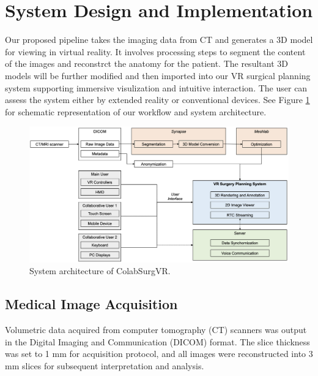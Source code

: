 \documentclass{bmcart}
\begin{document}
 
 
\section{System Design and Implementation}
Our proposed pipeline takes the imaging data from CT and generates a 3D model for viewing in virtual reality. It involves processing steps to segment the content of the images and reconstrct the anatomy for the patient. The resultant 3D models will be further modified and then imported into our VR surgical planning system supporting immersive visulization and intuitive interaction. The user can assess the system either by extended reality or conventional devices. See Figure \ref{fig:Scheme} for schematic representation of our workflow and system architecture.



\begin{figure}
  \centering
  \includegraphics[width=.9\linewidth]{../Media/Scheme}  
  \caption{System architecture of ColabSurgVR.}
  \label{fig:Scheme}
\end{figure}

\subsection{Medical Image Acquisition}
Volumetric data acquired from computer tomography (CT) scanners was output in the Digital Imaging and Communication (DICOM) format. The slice thickness was set to 1 mm for acquisition protocol, and all images were reconstructed into 3 mm slices for subsequent interpretation and analysis.
\end{document}
